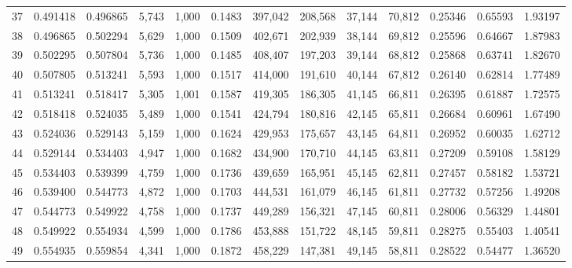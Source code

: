 \begin{tabular}{rrrrrrrrrrrrr}
37  &  0.491418 &  0.496865 &   5,743 &  1,000 &                                     0.1483 &  397,042 &  208,568 &   37,144 &   70,812 &  0.25346 &  0.65593 &  1.93197 \\
38  &  0.496865 &  0.502294 &   5,629 &  1,000 &                                     0.1509 &  402,671 &  202,939 &   38,144 &   69,812 &  0.25596 &  0.64667 &  1.87983 \\
39  &  0.502295 &  0.507804 &   5,736 &  1,000 &                                     0.1485 &  408,407 &  197,203 &   39,144 &   68,812 &  0.25868 &  0.63741 &  1.82670 \\
40  &  0.507805 &  0.513241 &   5,593 &  1,000 &                                     0.1517 &  414,000 &  191,610 &   40,144 &   67,812 &  0.26140 &  0.62814 &  1.77489 \\
41  &  0.513241 &  0.518417 &   5,305 &  1,001 &                                     0.1587 &  419,305 &  186,305 &   41,145 &   66,811 &  0.26395 &  0.61887 &  1.72575 \\
42  &  0.518418 &  0.524035 &   5,489 &  1,000 &                                     0.1541 &  424,794 &  180,816 &   42,145 &   65,811 &  0.26684 &  0.60961 &  1.67490 \\
43  &  0.524036 &  0.529143 &   5,159 &  1,000 &                                     0.1624 &  429,953 &  175,657 &   43,145 &   64,811 &  0.26952 &  0.60035 &  1.62712 \\
44  &  0.529144 &  0.534403 &   4,947 &  1,000 &                                     0.1682 &  434,900 &  170,710 &   44,145 &   63,811 &  0.27209 &  0.59108 &  1.58129 \\
45  &  0.534403 &  0.539399 &   4,759 &  1,000 &                                     0.1736 &  439,659 &  165,951 &   45,145 &   62,811 &  0.27457 &  0.58182 &  1.53721 \\
46  &  0.539400 &  0.544773 &   4,872 &  1,000 &                                     0.1703 &  444,531 &  161,079 &   46,145 &   61,811 &  0.27732 &  0.57256 &  1.49208 \\
47  &  0.544773 &  0.549922 &   4,758 &  1,000 &                                     0.1737 &  449,289 &  156,321 &   47,145 &   60,811 &  0.28006 &  0.56329 &  1.44801 \\
48  &  0.549922 &  0.554934 &   4,599 &  1,000 &                                     0.1786 &  453,888 &  151,722 &   48,145 &   59,811 &  0.28275 &  0.55403 &  1.40541 \\
49  &  0.554935 &  0.559854 &   4,341 &  1,000 &                                     0.1872 &  458,229 &  147,381 &   49,145 &   58,811 &  0.28522 &  0.54477 &  1.36520 \\

\end{tabular}
